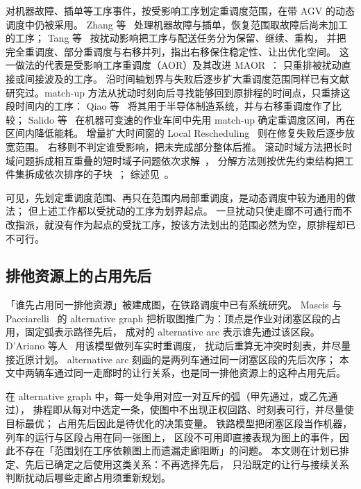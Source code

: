 \documentclass[manuscript,screen,review]{acmart}
\begin{document}
对机器故障、插单等工序事件，按受影响工序划定重调度范围，在带 AGV 的动态调度中仍被采用。
Zhang 等~\cite{zhang2023energy} 处理机器故障与插单，恢复范围取故障后尚未加工的工序；
Tang 等~\cite{tang2026dynamic} 按扰动影响把工序与配送任务分为保留、继续、重构，
并把完全重调度、部分重调度与右移并列，指出右移保住稳定性、让出优化空间。
这一做法的代表是受影响工序重调度（AOR）及其改进 MAOR~\cite{subramaniam2003maor}：
只重排被扰动直接或间接波及的工序。
沿时间轴划界与失败后逐步扩大重调度范围同样已有文献研究过。match-up 方法从扰动时刻向后寻找能够回到原排程的时间点，只重排这段时间内的工序：
Qiao 等~\cite{qiao2012single} 将其用于半导体制造系统，并与右移重调度作了比较；
Salido 等~\cite{salido2017rescheduling} 在机器可变速的作业车间中先用 match-up 确定重调度区间，再在区间内降低能耗。
增量扩大时间窗的 Local Rescheduling~\cite{kuster2007local} 则在修复失败后逐步放宽范围。
右移则不判定谁受影响，把未完成部分整体后推。
滚动时域方法把长时域问题拆成相互重叠的短时域子问题依次求解~\cite{li2025learning}，
分解方法则按优先约束结构把工件集拆成依次排序的子块~\cite{margot2003decompositions}；
综述见~\cite{vieira2003rescheduling,ouelhadj2009survey}。

可见，先划定重调度范围、再只在范围内局部重调度，是动态调度中较为通用的做法；
但上述工作都以受扰动的工序为划界起点。
一旦扰动只使走廊不可通行而不改指派，就没有作为起点的受扰工序，按该方法划出的范围必然为空，原排程却已不可行。

\subsection{排他资源上的占用先后}
\label{sec:rw_ag}

「谁先占用同一排他资源」被建成图，在铁路调度中已有系统研究。
Mascis 与 Pacciarelli~\cite{mascis2002alternative} 的 alternative graph
把析取图推广为：顶点是作业对闭塞区段的占用，固定弧表示路径先后，
成对的 alternative arc 表示谁先通过该区段。
D'Ariano 等人~\cite{dariano2007branch} 用该模型做列车实时重调度，
扰动后重算无冲突时刻表，并尽量接近原计划。
alternative arc 刻画的是两列车通过同一闭塞区段的先后次序；
本文中两辆车通过同一走廊时的让行关系，也是同一排他资源上的这种占用先后。

在 alternative graph 中，每一处争用对应一对互斥的弧（甲先通过，或乙先通过），
排程即从每对中选定一条，使图中不出现正权回路、时刻表可行，并尽量使目标最优；
占用先后因此是待优化的决策变量。
铁路模型把闭塞区段当作机器，列车的运行与区段占用在同一张图上，
区段不可用即直接表现为图上的事件，因此不存在「范围划在工序依赖图上而遗漏走廊阻断」的问题。
本文则在计划已排定、先后已确定之后使用这类关系：不再选择先后，
只沿既定的让行与接续关系判断扰动后哪些走廊占用须重新规划。
\end{document}
